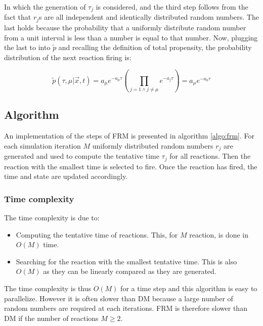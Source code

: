   In which the generation of $\tau_j$ is considered, and the third step follows from the fact that $r_j$s are all independent and identically distributed random numbers.
  The last holds because the probability that a uniformly distribute random number from a unit interval is less than a number is equal to that number.
  Now, plugging the last to into $\tilde{p}$ and recalling the definition of total propensity, the probability distribution of the next reaction firing is:

  $$\tilde{p}(\tau,\mu|\vec{x},t) = a_\mu e^{-a_\mu\tau}\left(\prod\limits_{j=1\land j\neq\mu}e^{-a_j\tau}\right) = a_\mu e^{-a_0\tau}$$

  \subsection{Algorithm}
  An implementation of the steps of FRM is presented in algorithm \ref{algo:frm}.
  For each simulation iteration $M$ uniformly distributed random numbers $r_j$ are generated and used to compute the tentative time $\tau_j$ for all reactions.
  Then the reaction with the smallest time is selected to fire.
  Once the reaction has fired, the time and state are updated accordingly.

  

    \subsubsection{Time complexity}
    The time complexity is due to:

    \begin{multicols}{2}
      \begin{itemize}
        \item Computing the tentative time of reactions.
          This, for $M$ reaction, is done in $O(M)$ time.
        \item Searching for the reaction with the smallest tentative time.
          This is also $O(M)$ as they can be linearly compared as they are generated.
      \end{itemize}
    \end{multicols}

    The time complexity is thus $O(M)$ for a time step and this algorithm is easy to parallelize.
    However it is often slower than DM because a large number of random numbers are required at each iterations.
    FRM is therefore slower than DM if the number of reactions $M\ge 2$.

